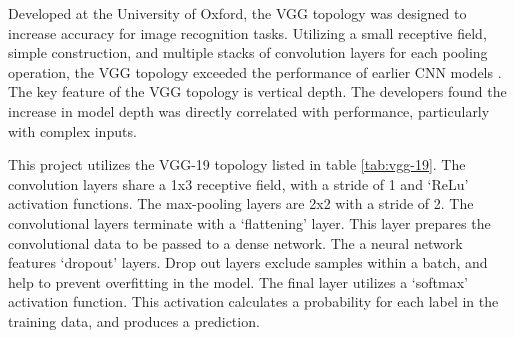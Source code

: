 		Developed at the University of Oxford, the VGG topology was designed to increase accuracy for image recognition tasks. Utilizing a small receptive field, simple construction, and multiple stacks of convolution layers for each pooling operation, the VGG topology exceeded the performance of earlier CNN models \cite{VGG-19}. The key feature of the VGG topology is vertical depth. The developers found the increase in model depth was directly correlated with performance, particularly with complex inputs.

		This project utilizes the VGG-19 topology listed in table \ref{tab:vgg-19}. The convolution layers share a 1x3 receptive field, with a stride of 1 and `ReLu' activation functions. The max-pooling layers are 2x2 with a stride of 2. The convolutional layers terminate with a `flattening' layer. This layer prepares the convolutional data to be passed to a dense network. The a neural network features `dropout' layers. Drop out layers exclude samples within a batch, and help to prevent overfitting in the model. The final layer utilizes a `softmax' activation function. This activation calculates a probability for each label in the training data, and produces a prediction.


